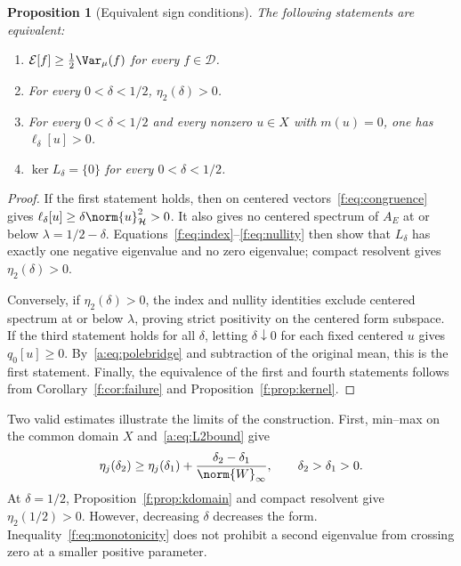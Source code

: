 \documentclass[11pt,a4paper]{article}
\numberwithin{equation}{section}
\newtheorem{proposition}[theorem]{Proposition}
\theoremstyle{definition}\newtheorem{definition}[theorem]{Definition}
\theoremstyle{remark}\newtheorem{remark}[theorem]{Remark}
\newcommand{\E}{\mathcal E}\newcommand{\D}{\mathcal D}
\newcommand{\Hh}{\mathcal H}\newcommand{\Hw}{\mathcal H}
\begin{document}
\begin{proposition}[Equivalent sign conditions]\label{f:prop:sign}
The following statements are equivalent:
\begin{enumerate}
\item $\E[f]\ge\tfrac12\Var_\mu(f)$ for every $f\in\D$.
\item For every $0<\delta<1/2$, $\eta_2(\delta)>0$.
\item For every $0<\delta<1/2$ and every nonzero $u\in X$ with $m(u)=0$, one has $\ell_\delta[u]>0$.
\item $\ker L_\delta=\{0\}$ for every $0<\delta<1/2$.
\end{enumerate}
\end{proposition}
\begin{proof}
If the first statement holds, then on centered vectors~\eqref{f:eq:congruence} gives $\ell_\delta[u]\ge\delta\norm{u}_{\Hh}^2>0$. It also gives no centered spectrum of $A_E$ at or below $\lambda=1/2-\delta$. Equations~\eqref{f:eq:index}--\eqref{f:eq:nullity} then show that $L_\delta$ has exactly one negative eigenvalue and no zero eigenvalue; compact resolvent gives $\eta_2(\delta)>0$.

Conversely, if $\eta_2(\delta)>0$, the index and nullity identities exclude centered spectrum at or below $\lambda$, proving strict positivity on the centered form subspace. If the third statement holds for all $\delta$, letting $\delta\downarrow0$ for each fixed centered $u$ gives $q_0[u]\ge0$. By~\eqref{a:eq:polebridge} and subtraction of the original mean, this is the first statement. Finally, the equivalence of the first and fourth statements follows from Corollary~\ref{f:cor:failure} and Proposition~\ref{f:prop:kernel}.
\end{proof}

Two valid estimates illustrate the limits of the construction. First, min--max on the common domain $X$ and~\eqref{a:eq:L2bound} give
\begin{equation}\label{f:eq:monotonicity}
 \eta_j(\delta_2)\ge\eta_j(\delta_1)
       +\frac{\delta_2-\delta_1}{\norm{W}_\infty},
       \qquad\delta_2>\delta_1>0.
\end{equation}
At $\delta=1/2$, Proposition~\ref{f:prop:kdomain} and compact resolvent give $\eta_2(1/2)>0$. However, decreasing $\delta$ decreases the form. Inequality~\eqref{f:eq:monotonicity} does not prohibit a second eigenvalue from crossing zero at a smaller positive parameter.
\end{document}
